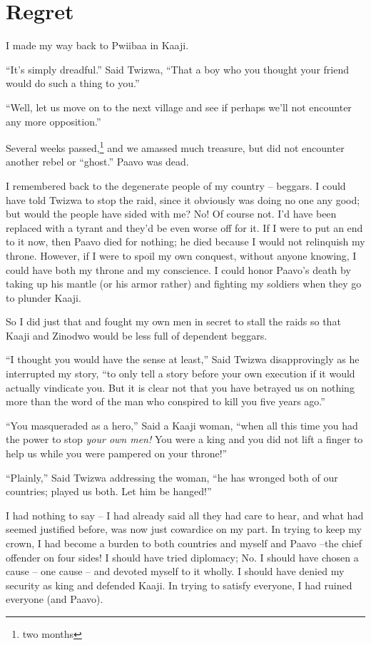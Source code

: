 \chapter{Regret}

I made my way back to Pwiibaa in Kaaji.

``It's simply dreadful.'' Said Twizwa, ``That a boy who you thought your friend would do such a thing to you.''

``Well, let us move on to the next village and see if perhaps we'll not encounter any more opposition.''

Several weeks passed,\footnote{two months} and we amassed much treasure, but did not encounter another rebel or ``ghost.'' Paavo was dead.

I remembered back to the degenerate people of my country -- beggars. I could have told Twizwa to stop the raid, since it obviously was doing no one any good; but would the people have sided with me? No! Of course not. I'd have been replaced with a tyrant and they'd be even worse off for it. If I were to put an end to it now, then Paavo died for nothing; he died because I would not relinquish my throne. However, if I were to spoil my own conquest, without anyone knowing, I could have both my throne and my conscience. I could honor Paavo's death by taking up his mantle (or his armor rather) and fighting my soldiers when they go to plunder Kaaji.

So I did just that and fought my own men in secret to stall the raids so that Kaaji and Zinodwo would be less full of dependent beggars.

\tbreak

``I thought you would have the sense at least,'' Said Twizwa disapprovingly as he interrupted my story, ``to only tell a story before your own execution if it would actually vindicate you. But it is clear not that you have betrayed us on nothing more than the word of the man who conspired to kill you five years ago.''

``You masqueraded as a hero,'' Said a Kaaji woman, ``when all this time you had the power to stop \emph{your own men!} You were a king and you did not lift a finger to help us while you were pampered on your throne!''

``Plainly,'' Said Twizwa addressing the woman, ``he has wronged both of our countries; played us both. Let him be hanged!''

I had nothing to say -- I had already said all they had care to hear, and what had seemed justified before, was now just cowardice on my part. In trying to keep my crown, I had become a burden to both countries and myself and Paavo --the chief offender on four sides! I should have tried diplomacy; No. I should have chosen a cause -- one cause -- and devoted myself to it wholly. I should have denied my security as king and defended Kaaji. In trying to satisfy everyone, I had ruined everyone (and Paavo).


